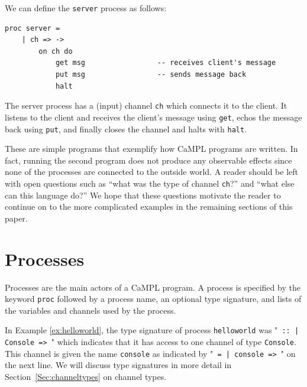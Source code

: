 \documentclass[11pt]{article}
\begin{document}
We can define the  \lstinline$server$ process as follows:
\begin{lstlisting}
proc server =  
	| ch => ->
		on ch do
			get msg					-- receives client's message
			put msg					-- sends message back
			halt
\end{lstlisting}	
The server process has a (input) channel \lstinline$ch$ which connects it to the client. 
It listens to the client and receives the client's message using \lstinline$get$, echos the message back using \lstinline$put$, and finally closes the channel and halts with \lstinline$halt$.

These are simple programs that exemplify how CaMPL programs are written.
In fact, running the second program does not produce any observable effects since none of the processes are connected to the outside world.
A reader should be left with open questions such as ``what was the type of channel \lstinline$ch$?'' and ``what else can this language do?'' 
We hope that these questions motivate the reader to continue on to the more complicated examples in the remaining sections of this paper.



\section{Processes}
\label{Sec:Processes}

Processes are the main actors of a CaMPL program. %
A process is specified by the keyword \lstinline$proc$ followed by a process name, an optional type signature, and lists of the variables and channels used by the process.

In Example \ref{ex:helloworld}, the type signature of process \lstinline$helloworld$ was "\lstinline$ :: | Console => $" which indicates that it has access to one channel of type \lstinline$Console$.
This channel is given the name \lstinline$console$ as indicated by "\lstinline$ = | console => $" on the next line.
We will discuss type signatures in more detail in Section~\ref{Sec:channeltypes} on channel types.
\end{document}
